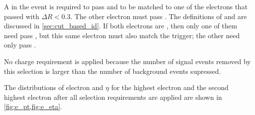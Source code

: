 A \CentralElectron in the event is required to pass \EGTIGHT and to be matched
to one of the electrons that passed \SingleElectronTrigger with $\Delta R <
0.3$. The other electron must pass \EGMEDIUM. The definitions of \EGMEDIUM and
\EGTIGHT are discussed in \cref{sec:cut_based_id}. If both electrons are
\CentralElectrons, then only one of them need pass \EGTIGHT, but this same
electron must also match the trigger; the other \CentralElectron need only pass
\EGMEDIUM.

No charge requirement is applied because the number of signal events removed by
this selection is larger than the number of background events supressed.

The distributions of electron \pt and $\eta$ for the highest \pt electron and
the second highest \pt electron after all selection requirements are applied
are shown in \cref{fig:e_pt,fig:e_eta}.

